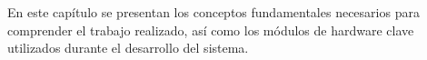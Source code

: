 En este capítulo se presentan los conceptos fundamentales necesarios para comprender el trabajo realizado, así como los módulos de hardware clave utilizados durante el desarrollo del sistema. 